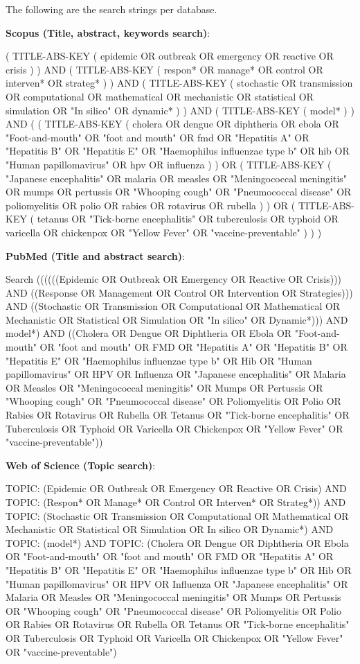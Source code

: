 \documentclass[10pt,letterpaper]{article}
\begin{document}
The following are the search strings per database. 

\textbf{Scopus (Title, abstract, keywords search)}:

( TITLE-ABS-KEY ( epidemic  OR  outbreak  OR  emergency  OR  reactive  OR  crisis ) )  AND  ( TITLE-ABS-KEY ( respon*  OR  manage*  OR  control  OR  interven*  OR  strateg* ) )  AND  ( TITLE-ABS-KEY ( stochastic  OR  transmission  OR  computational  OR  mathematical  OR  mechanistic  OR  statistical  OR  simulation  OR  "In silico"  OR  dynamic* ) )  AND  ( TITLE-ABS-KEY ( model* ) )  AND  ( ( TITLE-ABS-KEY ( cholera  OR  dengue  OR  diphtheria  OR  ebola  OR  "Foot-and-mouth"  OR  "foot and mouth"  OR  fmd  OR  "Hepatitis A"  OR  "Hepatitis B"  OR  "Hepatitis E"  OR  "Haemophilus influenzae type b"  OR  hib  OR  "Human papillomavirus"  OR  hpv  OR  influenza ) )  OR  ( TITLE-ABS-KEY ( "Japanese encephalitis"  OR  malaria  OR  measles  OR  "Meningococcal meningitis"  OR  mumps  OR  pertussis  OR  "Whooping cough"  OR  "Pneumococcal disease"  OR  poliomyelitis  OR  polio  OR  rabies  OR  rotavirus  OR  rubella ) )  OR  ( TITLE-ABS-KEY ( tetanus  OR  "Tick-borne encephalitis"  OR  tuberculosis  OR  typhoid  OR  varicella  OR  chickenpox  OR  "Yellow Fever"  OR  "vaccine-preventable" ) ) )

\textbf{PubMed (Title and abstract search)}:

Search ((((((Epidemic OR Outbreak OR Emergency OR Reactive OR Crisis))) AND ((Response OR Management OR Control OR Intervention OR Strategies))) AND ((Stochastic OR Transmission OR Computational OR Mathematical OR Mechanistic OR Statistical OR Simulation OR "In silico" OR Dynamic*))) AND model*) AND ((Cholera OR Dengue OR Diphtheria OR Ebola OR "Foot-and-mouth" OR "foot and mouth" OR FMD OR "Hepatitis A" OR "Hepatitis B" OR "Hepatitis E" OR "Haemophilus influenzae type b" OR Hib OR "Human papillomavirus" OR HPV OR Influenza OR "Japanese encephalitis" OR Malaria OR Measles OR "Meningococcal meningitis" OR Mumps OR Pertussis OR "Whooping cough" OR "Pneumococcal disease" OR Poliomyelitis OR Polio OR Rabies OR Rotavirus OR Rubella OR Tetanus OR "Tick-borne encephalitis" OR Tuberculosis OR Typhoid OR Varicella OR Chickenpox OR "Yellow Fever" OR "vaccine-preventable"))

\textbf{Web of Science (Topic search)}:

TOPIC: (Epidemic OR Outbreak OR Emergency OR Reactive OR Crisis) AND TOPIC: (Respon* OR  Manage*  OR  Control  OR  Interven*  OR  Strateg*)) AND TOPIC: (Stochastic OR Transmission OR Computational OR Mathematical OR Mechanistic OR Statistical OR Simulation OR In silico OR Dynamic*) AND TOPIC: (model*) AND TOPIC: (Cholera OR Dengue OR Diphtheria OR Ebola OR "Foot-and-mouth" OR "foot and mouth" OR FMD OR "Hepatitis A" OR "Hepatitis B" OR "Hepatitis E" OR "Haemophilus influenzae type b" OR Hib OR "Human papillomavirus" OR HPV OR Influenza OR "Japanese encephalitis" OR Malaria OR Measles OR "Meningococcal meningitis" OR Mumps OR Pertussis OR "Whooping cough" OR "Pneumococcal disease" OR Poliomyelitis OR Polio OR Rabies OR Rotavirus OR Rubella OR Tetanus OR "Tick-borne encephalitis" OR Tuberculosis OR Typhoid OR Varicella OR Chickenpox OR "Yellow Fever" OR "vaccine-preventable")
\end{document}
